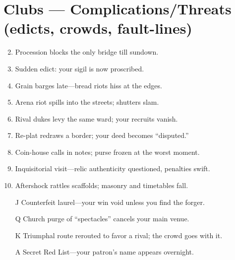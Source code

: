 \section*{Clubs --- Complications/Threats (edicts, crowds, fault-lines)}
\begin{enumerate}
\setcounter{enumi}{1}
\item Procession blocks the only bridge till sundown.
\item Sudden edict: your sigil is now proscribed.
\item Grain barges late---bread riots hiss at the edges.
\item Arena riot spills into the streets; shutters slam.
\item Rival dukes levy the same ward; your recruits vanish.
\item Re-plat redraws a border; your deed becomes ``disputed.''
\item Coin-house calls in notes; purse frozen at the worst moment.
\item Inquisitorial visit---relic authenticity questioned, penalties swift.
\item Aftershock rattles scaffolds; masonry and timetables fall.
\item[J] Counterfeit laurel---your win void unless you find the forger.
\item[Q] Church purge of ``spectacles'' cancels your main venue.
\item[K] Triumphal route rerouted to favor a rival; the crowd goes with it.
\item[A] Secret Red List---your patron's name appears overnight.
\end{enumerate}

